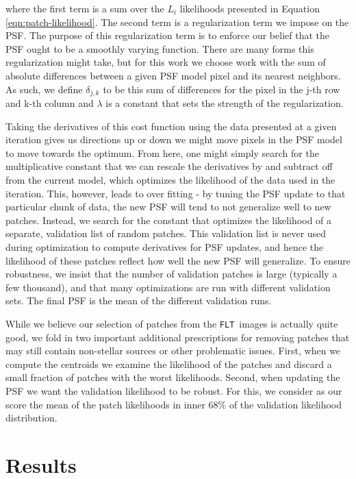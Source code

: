 \documentclass[12pt,letterpaper,preprint]{aastex}
\newcommand{\FLT}{\texttt{FLT}}
\begin{document}
\noindent where the first term is a sum over the $L_i$ likelihoods presented in Equation 
\ref{eqn:patch-likelihood}.  The second term is a regularization term we impose on the PSF.
The purpose of this regularization term is to enforce our belief that the PSF ought to be a 
smoothly varying function.  There are many forms this regularization might take, but for this 
work we choose work with the sum of absolute differences between a given PSF model pixel and its 
nearest neighbors.  As such, we define $\delta_{j, k}$ to be this sum of differences for the pixel 
in the j-th row and k-th column and $\lambda$ is a constant that sets the strength of the regularization.

Taking the derivatives of this cost function using the data presented at a given iteration 
gives us directions up or down we might move pixels in the PSF model to move towards the 
optimum.  From here, one might simply search for the multiplicative constant that we can 
rescale the derivatives by and subtract off from the current model, which optimizes the likelihood 
of the data used in the iteration.  This, however, leads to over fitting - by tuning the PSF 
update to that particular chunk of data, the new PSF will tend to not generalize well to new 
patches.  Instead, we search for the constant that optimizes the likelihood of a separate, 
validation list of random patches.  This validation list is never used during optimization to compute
derivatives for PSF updates, and hence the likelihood of these patches reflect how well the 
new PSF will generalize.  To ensure robustness, we insist that the number of validation patches 
is large (typically a few thousand), and that many optimizations are run with different validation 
sets.  The final PSF is the mean of the different validation runs.

While we believe our selection of patches from the \FLT\, images is actually quite good, we fold in 
two important additional prescriptions for removing patches that may still contain non-stellar sources 
or other problematic issues.  First, when we compute the centroids we examine the likelihood of the 
patches and discard a small fraction of patches with the worst likelihoods.  Second, when updating 
the PSF we want the validation likelihood to be robust.  For this, we consider as our score the 
mean of the patch likelihoods in inner 68\% of the validation likelihood distribution.

\section{Results}
\end{document}

